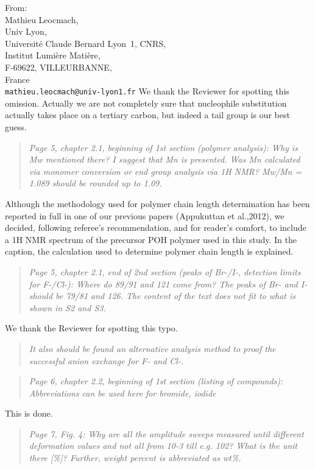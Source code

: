 \documentclass[a4paper, parskip=true, firsthead=false, fromemail=true, foldmarks=false]{scrlttr2}
\newenvironment{quotationi}
{\begin{quotation}\itshape}
{\end{quotation}}
\begin{document}
\begin{letter}{From:\\
Mathieu Leocmach,\\
Univ Lyon,\\ 
Universit\'e Claude Bernard Lyon~1, CNRS,\\
Institut Lumi\`ere Mati\`ere,\\
F-69622, VILLEURBANNE,\\
France\\
\texttt{mathieu.leocmach@univ-lyon1.fr}
}
We thank the Reviewer for spotting this omission. Actually we are not completely sure that nucleophile substitution actually takes place on a tertiary carbon, but indeed a  tail group is our best guess.

\begin{quotationi}
Page 5, chapter 2.1, beginning of 1st section (polymer analysis): Why is Mw mentioned there? I suggest that Mn is presented. Was Mn calculated via monomer conversion or end group analysis via 1H NMR? Mw/Mn = 1.089 should be rounded up to 1.09.
\end{quotationi}

Although the methodology used for polymer chain length determination has been reported in full in one of our previous papers (Appukuttan et al.,2012), we decided, following referee's recommendation, and for reader's comfort, to include a 1H NMR spectrum of the precursor POH polymer used in this study. In the caption, the calculation used to determine polymer chain length is explained.


\begin{quotationi}
Page 5, chapter 2.1, end of 2nd section (peaks of Br-/I-, detection limits for F-/Cl-): Where do 89/91 and 121 come from? The peaks of Br- and I- should be 79/81 and 126. The content of the text does not fit to what is shown in S2 and S3.\end{quotationi}

We thank the Reviewer for spotting this typo.

\begin{quotationi}
 It also should be found an alternative analysis method to proof the successful anion exchange for F- and Cl-.
\end{quotationi}

\begin{quotationi}
Page 6, chapter 2.2, beginning of 1st section (listing of compounds): Abbreviations can be used here for bromide, iodide 
\end{quotationi}

This is done.

\begin{quotationi}
Page 7, Fig. 4: Why are all the amplitude sweeps measured until different deformation values and not all from 10-3 till e.g. 102? What is the unit there [\%]? Further, weight percent is abbreviated as wt\%.
\end{quotationi}


\end{letter}
\end{document}

